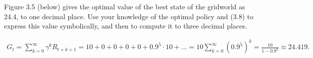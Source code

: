 
\begin{exercise}[Exercise 3.24]

Figure 3.5 (below) gives the optimal value of the best state of the gridworld as 24.4,
to one decimal place. Use your knowledge of the optimal policy and (3.8) to express
this value symbolically, and then to compute it to three decimal places.


\end{exercise}


\begin{solution}

\begin{align*}
  G_t = \sum_{k=0}^{\infty}\gamma^kR_{t+k+1} = 10 + 0 + 0 + 0 + 0 + 0.9^5\cdot10 + \dots
  = 10\sum_{k=0}^{\infty}(0.9^5)^k = \frac{10}{1 - 0.9^5} \approx 24.419.
\end{align*}

\end{solution}

